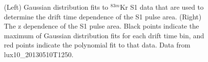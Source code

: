 \begin{figure} 
\centering
{}
\qquad
{}
\caption{ (Left) Gaussian distribution fits to $^{83m}$Kr S1 data that are used to determine the drift time dependence of the S1 pulse area. (Right) The z dependence of the S1 pulse area. Black points indicate the maximum of Gaussian distribution fits for each drift time bin, and red points indicate the polynomial fit to that data. Data from lux10\_20130510T1250.}
\label{fig:KrypCal_S1ZDep}
\end{figure}

